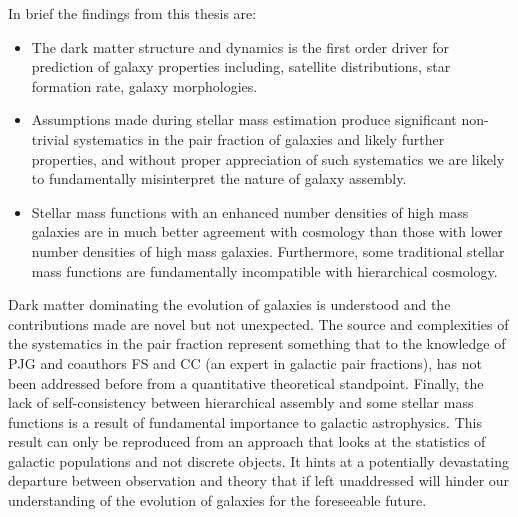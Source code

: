 In brief the findings from this thesis are: 
\begin{itemize}
    \item The dark matter structure and dynamics is the first order driver for prediction of galaxy properties including, satellite distributions, star formation rate, galaxy morphologies. 
    \item Assumptions made during stellar mass estimation produce significant non-trivial systematics in the pair fraction of galaxies and likely further properties, and without proper appreciation of such systematics we are likely to fundamentally misinterpret the nature of galaxy assembly. 
    \item Stellar mass functions with an enhanced number densities of high mass galaxies are in much better agreement with \LCDM cosmology than those with lower number densities of high mass galaxies. Furthermore, some traditional stellar mass functions are fundamentally incompatible with \LCDM hierarchical cosmology.
\end{itemize}

Dark matter dominating the evolution of galaxies is understood and the contributions made are novel but not unexpected. The source and complexities of the systematics in the pair fraction represent something that to the knowledge of PJG and coauthors FS and CC (an expert in galactic pair fractions), has not been addressed before from a quantitative theoretical standpoint. Finally, the lack of self-consistency between hierarchical \LCDM assembly and some stellar mass functions is a result of fundamental importance to galactic astrophysics. This result can only be reproduced from an approach that looks at the statistics of galactic populations and not discrete objects. It hints at a potentially devastating departure between observation and theory that if left unaddressed will hinder our understanding of the evolution of galaxies for the foreseeable future.
